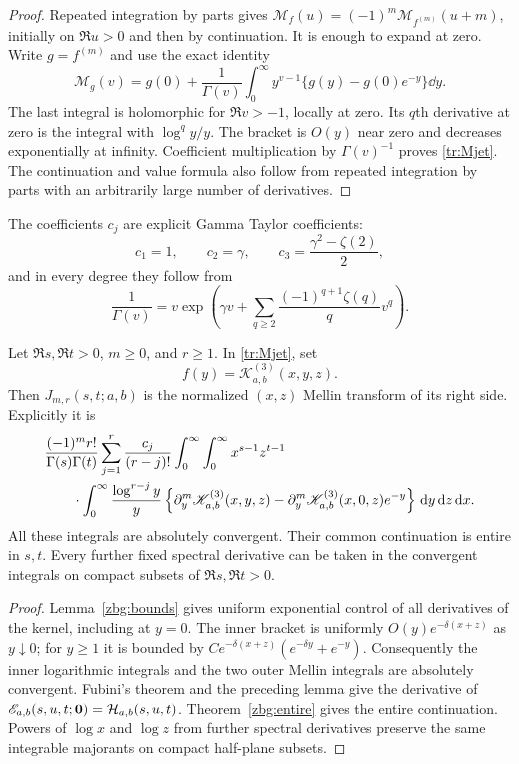 \begin{proof}
Repeated integration by parts gives
$\mathcal M_f(u)=(-1)^m\mathcal M_{f^{(m)}}(u+m)$, initially on
$\Re u>0$ and then by continuation. It is enough to expand at zero.
Write $g=f^{(m)}$ and use the exact identity
\[
 \mathcal M_g(v)=g(0)+\frac1{\Gamma(v)}
       \int_0^\infty y^{v-1}\{g(y)-g(0)e^{-y}\}\dd y .
\]
The last integral is holomorphic for $\Re v>-1$, locally at zero.
Its $q$th derivative at zero is the integral with
$\log^qy/y$. The bracket is $O(y)$ near zero and decreases
exponentially at infinity. Coefficient multiplication by
$\Gamma(v)^{-1}$ proves \eqref{tr:Mjet}.
The continuation and value formula also follow from repeated integration
by parts with an arbitrarily large number of derivatives.
\end{proof}

The coefficients $c_j$ are explicit Gamma Taylor coefficients:
\[
 c_1=1,\qquad c_2=\gamma,\qquad
 c_3=\frac{\gamma^2-\zeta(2)}2,
\]
and in every degree they follow from
\[
 \frac1{\Gamma(v)}
     =v\exp\left(\gamma v+
             \sum_{q\geq2}\frac{(-1)^{q+1}\zeta(q)}qv^q\right).
\]

\begin{theorem}
\label{tr:integral}
Let $\Re s,\Re t>0$, $m\geq0$, and $r\geq1$. In
\eqref{tr:Mjet}, set
\[
 f(y)=\mathscr K_{a,b}^{(3)}(x,y,z).
\]
Then $J_{m,r}(s,t;a,b)$ is the normalized $(x,z)$ Mellin transform
of its right side. Explicitly it is
\begin{align}
 &\frac{(-1)^m r!}{\Gamma(s)\Gamma(t)}
 \sum_{j=1}^r\frac{c_j}{(r-j)!}
 \int_0^\infty\int_0^\infty
       x^{s-1}z^{t-1}\notag\\
 &\qquad\cdot\int_0^\infty \frac{\log^{r-j}y}{y}
 \left\{\partial_y^m\mathscr K^{(3)}_{a,b}(x,y,z)
       -\partial_y^m\mathscr K^{(3)}_{a,b}(x,0,z)e^{-y}\right\}
             \,\mathrm d y\,\mathrm d z\,\mathrm d x .
 \label{tr:tripleintegral}
\end{align}
All these integrals are absolutely convergent. Their common continuation
is entire in $s,t$. Every further fixed spectral derivative can be
taken in the convergent integrals on compact subsets of
$\Re s,\Re t>0$.
\end{theorem}

\begin{proof}
Lemma~\ref{zbg:bounds} gives uniform exponential control of all derivatives
of the kernel, including at $y=0$. The inner bracket is uniformly
$O(y)e^{-\delta(x+z)}$ as $y\downarrow0$; for $y\geq1$ it is bounded
by $Ce^{-\delta(x+z)}(e^{-\delta y}+e^{-y})$.
Consequently the inner logarithmic integrals and the two outer Mellin
integrals are absolutely convergent. Fubini's theorem and the preceding
lemma give the derivative of
$\mathscr E_{a,b}(s,u,t;\boldsymbol0)=\mathcal H_{a,b}(s,u,t)$.
Theorem~\ref{zbg:entire} gives the entire continuation. Powers of $\log x$
and $\log z$ from further spectral derivatives preserve the same
integrable majorants on compact half-plane subsets.
\end{proof}

